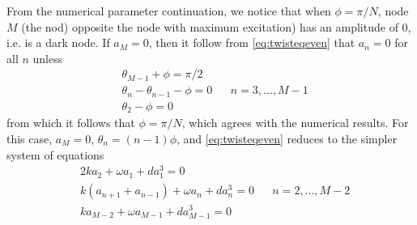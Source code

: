 \documentclass[12pt]{article}
\begin{document}
From the numerical parameter continuation, we notice that when $\phi = \pi/N$, node $M$ (the nod) opposite the node with maximum excitation) has an amplitude of 0, i.e. is a dark node. If $a_M = 0$, then it follow from \cref{eq:twisteqeven} that $a_n = 0$ for all $n$ unless
\begin{equation}\label{eq:evendarknodecond}
\begin{aligned}
&\theta_{M-1} + \phi = \pi/2 \\
&\theta_{n} - \theta_{n-1} - \phi = 0 && n = 3, \dots, M-1 \\
&\theta_2 - \phi = 0
\end{aligned}
\end{equation}
from which it follows that $\phi = \pi/N$, which agrees with the numerical results. For this case, $a_M = 0$, $\theta_n = (n-1)\phi$, and \cref{eq:twisteqeven} reduces to the simpler system of equations
\begin{equation}\label{eq:twisteqevenhole}
\begin{aligned}
&2 k a_2 + \omega a_1 + d a_1^3 = 0 \\
&k\left( a_{n+1} + a_{n-1} \right) + \omega a_n + d a_n^3 = 0 && n = 2, \dots, M-2 \\
&k a_{M-2} + \omega a_{M-1} + d a_{M-1}^3 = 0 \\
\end{aligned}
\end{equation}
\end{document}
